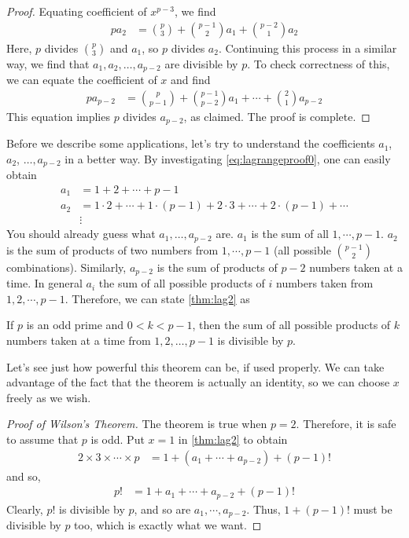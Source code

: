 \documentclass[12pt]{subfile}
\begin{document}
\begin{proof}[Proof]
			Equating coefficient of $x^{p-3}$, we find
				\begin{align*}
					pa_2
						& = \binom{p}{3}+\binom{p-1}{2}a_1+\binom{p-2}{1}a_2
				\end{align*}
			Here, $p$ divides $\binom{p}{3}$ and $a_1$, so $p$ divides $a_2$. Continuing this process in a similar way, we find that $a_1, a_2, \ldots, a_{p-2}$ are divisible by $p$. To check correctness of this, we can equate the coefficient of $x$ and find
				\begin{align*}
					pa_{p-2}
						& = \binom{p}{p-1}+\binom{p-1}{p-2}a_1+\cdots+\binom{2}{1}a_{p-2}
				\end{align*}
			This equation implies $p$ divides $a_{p-2}$, as claimed. The proof is complete.
		\end{proof}
	Before we describe some applications, let's try to understand the coefficients $a_1$, $a_2$, $\ldots,a_{p-2}$ in a better way. By investigating \eqref{eq:lagrangeproof0}, one can easily obtain
		\begin{align*}
			a_1 & = 1+2+\cdots+p-1\\
			a_2 & = 1\cdot2+\cdots+1\cdot(p-1)+2\cdot3+\cdots+2\cdot(p-1)+\cdots\\
				&  \vdots
		\end{align*}
	You should already guess what $a_1,\ldots,a_{p-2}$ are. $a_1$ is the sum of all $1,\cdots,p-1$. $a_2$ is the sum of products of two numbers from $1,\cdots,p-1$ (all possible $\binom{p-1}{2}$ combinations). Similarly, $a_{p-2}$ is the sum of products of $p-2$ numbers taken at a time. In general $a_i$ the sum of all possible products of $i$ numbers taken from $1,2,\cdots,p-1$. Therefore, we can state \autoref{thm:lag2} as
		\begin{theorem}
			If $p$ is an odd prime and $0<k<p-1$, then the sum of all possible products of $k$ numbers taken at a time from $1,2,\ldots,p-1$ is divisible by $p$.
		\end{theorem}
	Let's see just how powerful this theorem can be, if used properly. We can take advantage of the fact that the theorem is actually an identity, so we can choose $x$ freely as we wish.
		\begin{proof}[Proof of Wilson's Theorem]
			The theorem is true when $p=2$. Therefore, it is safe to assume that $p$ is odd. Put $x=1$ in \autoref{thm:lag2} to obtain
				\begin{align*}
					2\times 3 \times \cdots \times p & = 1+(a_1+\cdots+a_{p-2})+(p-1)!
				\end{align*}
			and so,
				\begin{align*}
					p! & = 1+a_1+\cdots+a_{p-2}+(p-1)!
				\end{align*}
			Clearly, $p!$ is divisible by $p$, and so are $a_1,\cdots,a_{p-2}$. Thus, $1+(p-1)!$ must be divisible by $p$ too, which is exactly what we want.
		\end{proof}
\end{document}
